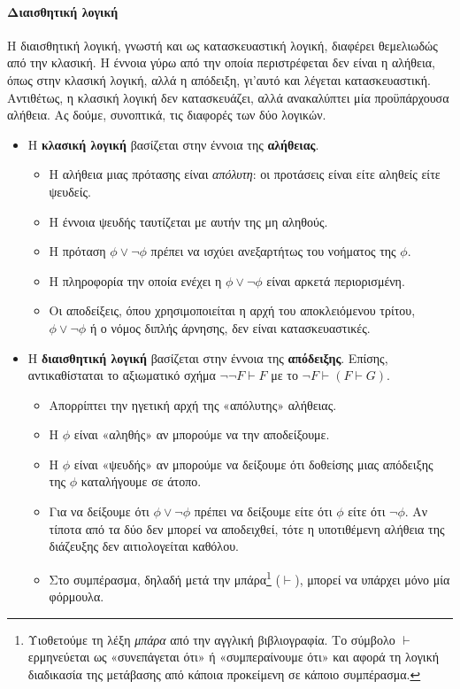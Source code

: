 \documentclass [a4paper,11pt] {book}
\theoremstyle{definition}
\theoremstyle{definition}
\begin{document}
\paragraph{Διαισθητική λογική}
\label{IntuitionisticLogic}
Η διαισθητική λογική, γνωστή και ως κατασκευαστική λογική, διαφέρει θεμελιωδώς από την κλασική. Η έννοια γύρω από την οποία περιστρέφεται δεν είναι η αλήθεια, όπως στην κλασική λογική, αλλά η απόδειξη, γι'αυτό και λέγεται κατασκευαστική. Αντιθέτως, η κλασική λογική δεν κατασκευάζει, αλλά ανακαλύπτει μία προϋπάρχουσα αλήθεια. Ας δούμε, συνοπτικά, τις διαφορές των δύο λογικών.
\begin{itemize}
\label{CL-IL}
\item Η \textbf{κλασική λογική} βασίζεται στην έννοια της \textbf{αλήθειας}.
\begin{itemize}
\item Η αλήθεια μιας πρότασης είναι \textit{απόλυτη}: οι προτάσεις είναι είτε αληθείς είτε ψευδείς.
\item Η έννοια ψευδής ταυτίζεται με αυτήν της μη αληθούς.
\item Η πρόταση $\phi \vee \neg \phi$ πρέπει να ισχύει ανεξαρτήτως του νοήματος της $\phi$.
\item Η πληροφορία την οποία ενέχει η $\phi \vee \neg \phi$ είναι αρκετά περιορισμένη.
\item Οι αποδείξεις, όπου χρησιμοποιείται η αρχή του αποκλειόμενου τρίτου, $\phi \vee \neg \phi$ ή ο νόμος διπλής άρνησης, δεν είναι κατασκευαστικές.
\end{itemize}
\item Η \textbf{διαισθητική λογική} βασίζεται στην έννοια της \textbf{απόδειξης}. Επίσης, αντικαθίσταται το αξιωματικό σχήμα $\neg \neg F \vdash F$ με το $\neg F \vdash (F\vdash G)$.
\begin{itemize}
\item Απορρίπτει την ηγετική αρχή της «απόλυτης» αλήθειας.
\item Η $\phi$ είναι «αληθής» αν μπορούμε να την αποδείξουμε.
\item Η $\phi$ είναι «ψευδής» αν μπορούμε να δείξουμε ότι δοθείσης μιας απόδειξης της $\phi$ καταλήγουμε σε άτοπο.
\item Για να δείξουμε ότι $\phi \vee \neg \phi$ πρέπει να δείξουμε είτε ότι $\phi$ είτε ότι $\neg \phi$. Αν τίποτα από τα δύο δεν μπορεί να αποδειχθεί, τότε η υποτιθέμενη αλήθεια της διάζευξης δεν αιτιολογείται καθόλου.
\item Στο συμπέρασμα, δηλαδή μετά την μπάρα\footnote{Υιοθετούμε τη λέξη \textit{μπάρα} από την αγγλική βιβλιογραφία. Το σύμβολο $\vdash$ ερμηνεύεται ως «συνεπάγεται ότι» ή «συμπεραίνουμε ότι» και αφορά τη λογική διαδικασία της μετάβασης από κάποια προκείμενη σε κάποιο συμπέρασμα.} ($\vdash$), μπορεί να υπάρχει μόνο μία φόρμουλα.
\end{itemize}
\end{itemize}
\end{document}
